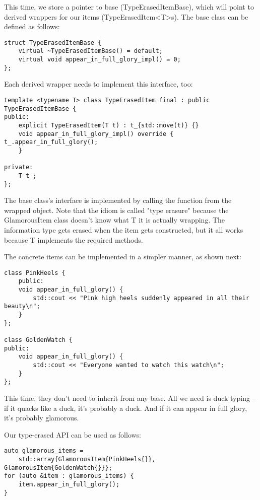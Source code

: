 This time, we store a pointer to base (TypeErasedItemBase), which will point to derived wrappers for our items (TypeErasedItem<T>s). The base class can be defined as follows:

\begin{lstlisting}[style=styleCXX]
struct TypeErasedItemBase {
	virtual ~TypeErasedItemBase() = default;
	virtual void appear_in_full_glory_impl() = 0;
};
\end{lstlisting}

Each derived wrapper needs to implement this interface, too:

\begin{lstlisting}[style=styleCXX]
template <typename T> class TypeErasedItem final : public
TypeErasedItemBase {
public:
	explicit TypeErasedItem(T t) : t_{std::move(t)} {}
	void appear_in_full_glory_impl() override { t_.appear_in_full_glory();
	}

private:
	T t_;
};
\end{lstlisting}

The base class's interface is implemented by calling the function from the wrapped object. Note that the idiom is called "type erasure" because the GlamorousItem class doesn't know what T it is actually wrapping. The information type gets erased when the item gets constructed, but it all works because T implements the  required methods.

The concrete items can be implemented in a simpler manner, as shown next:

\begin{lstlisting}[style=styleCXX]
class PinkHeels {
	public:
	void appear_in_full_glory() {
		std::cout << "Pink high heels suddenly appeared in all their beauty\n";
    }
};

class GoldenWatch {
public:
	void appear_in_full_glory() {
		std::cout << "Everyone wanted to watch this watch\n";
	}
};
\end{lstlisting}

This time, they don't need to inherit from any base. All we need is duck typing – if it quacks like a duck, it's probably a duck. And if it can appear in full glory, it's probably glamorous.

Our type-erased API can be used as follows:

\begin{lstlisting}[style=styleCXX]
auto glamorous_items =
	std::array{GlamorousItem{PinkHeels{}}, GlamorousItem{GoldenWatch{}}};
for (auto &item : glamorous_items) {
	item.appear_in_full_glory();
}
\end{lstlisting}

